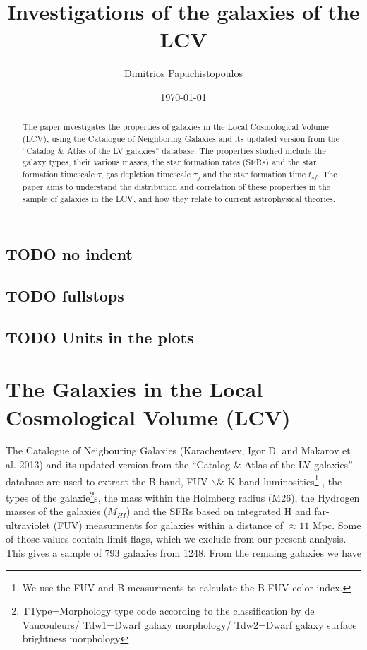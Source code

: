 \documentclass[a4paper,twocolumn]{article}
\author{Dimitrios Papachistopoulos}
\date{\today}
\title{Investigations of the galaxies of the LCV}
\begin{document}
\maketitle

\subsection{{\bfseries\sffamily TODO} no indent}
\label{sec:org8d9b93a}
\subsection{{\bfseries\sffamily TODO} fullstops}
\label{sec:orgde0c807}
\subsection{{\bfseries\sffamily TODO} Units in the plots}
\label{sec:org1a3080c}

\begin{abstract}
The paper investigates the properties of galaxies in the Local Cosmological Volume (LCV), using the Catalogue of Neighboring Galaxies\autocite{karachentsevUPDATEDNEARBYGALAXY2013} and its updated version from the ``Catalog \& Atlas of the LV galaxies'' database\autocite{CatalogLVGalaxies}. The properties studied include the galaxy types, their various masses, the star formation rates (SFRs) and the star formation timescale \(\tau\), gas depletion timescale \(\tau_g\) and the star formation time \(t_{sf}\). The paper aims to understand the distribution and correlation of these properties in the sample of galaxies in the LCV, and how they relate to current astrophysical theories.
\end{abstract}

\section{The Galaxies in the Local Cosmological Volume (LCV)}
\label{sec:org120a319}

The Catalogue of Neigbouring Galaxies (Karachentsev, Igor D. and Makarov  et al. 2013\autocite{karachentsevUPDATEDNEARBYGALAXY2013}) and its updated version from the ``Catalog \& Atlas of the LV galaxies'' database\autocite{CatalogLVGalaxies}  are used to extract the B-band, FUV $\backslash$& K-band luminosities\footnote{We use the FUV and B measurments to calculate the B-FUV color index.} , the types of the galaxie\footnote{TType=Morphology type code according to the classification by de Vaucouleurs/ Tdw1=Dwarf galaxy morphology/ Tdw2=Dwarf galaxy surface brightness morphology}s, the mass within the Holmberg radius (M26), the Hydrogen masses of the galaxies (\(M_{HI}\)) and the SFRs based on integrated  H and far-ultraviolet (FUV) measurments for galaxies within a distance of \(\approx 11\) Mpc. Some of those values contain limit flags, which we exclude from our present analysis. This gives a sample of 793 galaxies from 1248. From the remaing galaxies we have
\end{document}
